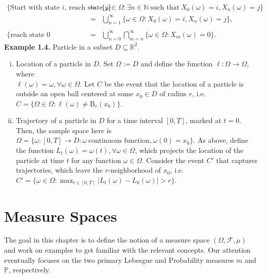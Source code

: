 \documentclass{article}
\begin{document}
	\begin{eqnarray}
	\nonumber
	\text{\{Start with state $i$, reach state $j$\}} &=& \{\omega \in \Omega: \exists n \in \mathbb{N} \ \text{such that} \ X_0(\omega) = i, X_n(\omega) = j\} \\
	\nonumber
	&=& \bigcup_{n=1}^{\infty}\{\omega \in \Omega: X_0(\omega) = i, X_n(\omega) = j\}, \\
	\nonumber \\
	\nonumber
	\text{\{reach state 0 eventually\}} &=& \bigcup_{n=0}^{\infty}\bigcap_{m = n}^{\infty}\{\omega \in \Omega: X_m(\omega) = 0\}.
	\end{eqnarray}
\textbf{Example 1.4.} Particle in a subset $D \subseteq \mathbb{R}^2$.
\begin{enumerate}[(i)]
	\item Location of a particle in $D$. Set $\Omega := D$ and define the function $\ell: \Omega \to \Omega$, where \\ $\ell(\omega) = \omega, \forall \omega \in \Omega$. Let $C$ be the event that the location of a particle is outside an open ball centered at some $x_0 \in D$ of radius $r$, i.e. $C = \{\Omega \in \Omega: \ell(\omega) \neq {\mathrm{B}}_r(x_0)\}$.
	\item Trajectory of a particle in $D$ for a time interval $[0,T]$, marked at $t=0$. Then, the sample space here is $\Omega = \{\omega: [0,T] \to D: \omega \ \text{continuous function,} \ \omega(0) = x_0\}$. As above, define the function $L_t(\omega) = \omega(t), \forall \omega \in \Omega$, which projects the location of the particle at time $t$ for any function $\omega \in \Omega$. Consider the event $C'$ that captures trajectories, which leave the $r$-neighborhood of $x_0$, i.e. $C' = \{\omega \in \Omega: \max_{t \in [0,T]}|L_t(\omega) - L_0(\omega)| > r\}$.
\end{enumerate}
\newpage
\section{Measure Spaces}
The goal in this chapter is to define the notion of a measure space $(\Omega, \mathcal{F}, \mu)$ and work on examples to get familiar with the relevant concepts. Our attention eventually focuses on the two primary Lebesgue and Probability measures $m$ and $\mathbb{P}$, respectively.
\end{document}
